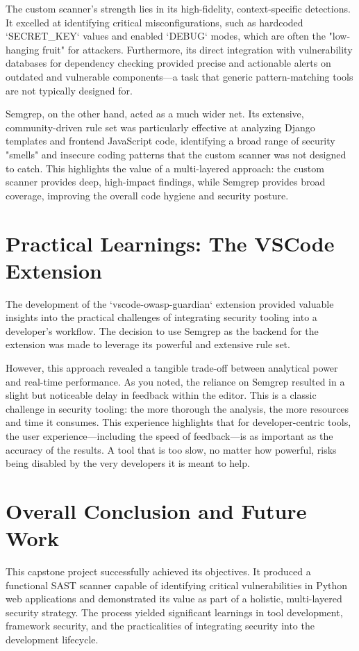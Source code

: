 The custom scanner's strength lies in its high-fidelity, context-specific detections. It excelled at identifying critical misconfigurations, such as hardcoded `SECRET\_KEY` values and enabled `DEBUG` modes, which are often the "low-hanging fruit" for attackers. Furthermore, its direct integration with vulnerability databases for dependency checking provided precise and actionable alerts on outdated and vulnerable components—a task that generic pattern-matching tools are not typically designed for.

Semgrep, on the other hand, acted as a much wider net. Its extensive, community-driven rule set was particularly effective at analyzing Django templates and frontend JavaScript code, identifying a broad range of security "smells" and insecure coding patterns that the custom scanner was not designed to catch. This highlights the value of a multi-layered approach: the custom scanner provides deep, high-impact findings, while Semgrep provides broad coverage, improving the overall code hygiene and security posture.

\section{Practical Learnings: The VSCode Extension}

The development of the `vscode-owasp-guardian` extension provided valuable insights into the practical challenges of integrating security tooling into a developer's workflow. The decision to use Semgrep as the backend for the extension was made to leverage its powerful and extensive rule set.

However, this approach revealed a tangible trade-off between analytical power and real-time performance. As you noted, the reliance on Semgrep resulted in a slight but noticeable delay in feedback within the editor. This is a classic challenge in security tooling: the more thorough the analysis, the more resources and time it consumes. This experience highlights that for developer-centric tools, the user experience—including the speed of feedback—is as important as the accuracy of the results. A tool that is too slow, no matter how powerful, risks being disabled by the very developers it is meant to help.

\section{Overall Conclusion and Future Work}

This capstone project successfully achieved its objectives. It produced a functional SAST scanner capable of identifying critical vulnerabilities in Python web applications and demonstrated its value as part of a holistic, multi-layered security strategy. The process yielded significant learnings in tool development, framework security, and the practicalities of integrating security into the development lifecycle.

